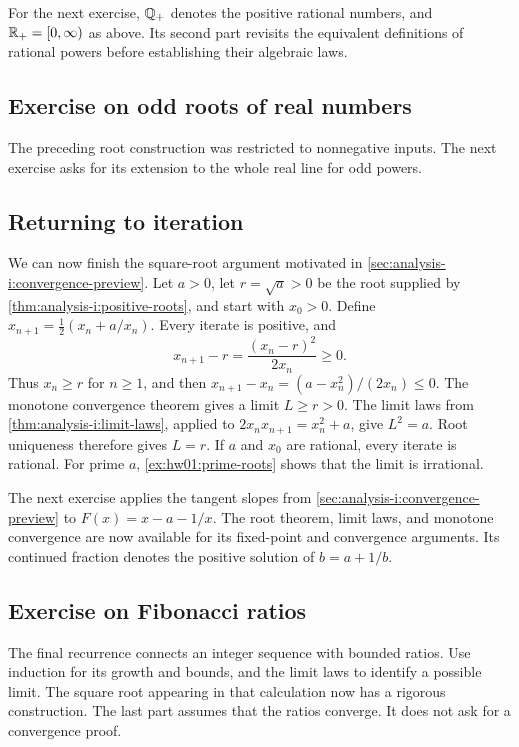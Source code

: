 For the next exercise, $\mathbb{Q}_+$ denotes the positive rational numbers,
and $\mathbb{R}_+=[0,\infty)$ as above. Its second part revisits the equivalent
definitions of rational powers before establishing their algebraic laws.



\subsection{Exercise on odd roots of real numbers}
The preceding root construction was restricted to nonnegative inputs.
The next exercise asks for its extension to the whole real line for odd
powers.



\subsection{Returning to iteration}
We can now finish the square-root argument motivated in
\autoref{sec:analysis-i:convergence-preview}. Let $a>0$, let
$r=\sqrt a>0$ be the root supplied by
\autoref{thm:analysis-i:positive-roots}, and start with $x_0>0$.
Define $x_{n+1}=\tfrac12(x_n+a/x_n)$. Every iterate is positive, and
\[
  x_{n+1}-r=\frac{(x_n-r)^2}{2x_n}\geq0.
\]
Thus $x_n\geq r$ for $n\geq1$, and then
$x_{n+1}-x_n=(a-x_n^2)/(2x_n)\leq0$.
The monotone convergence theorem gives a limit $L\geq r>0$.
The limit laws from \autoref{thm:analysis-i:limit-laws}, applied to
$2x_nx_{n+1}=x_n^2+a$, give $L^2=a$. Root uniqueness therefore gives
$L=r$. If $a$ and $x_0$ are rational, every iterate is rational.
For prime $a$, \autoref{ex:hw01:prime-roots} shows that the limit
is irrational.

The next exercise applies the tangent slopes from
\autoref{sec:analysis-i:convergence-preview} to $F(x)=x-a-1/x$.
The root theorem, limit laws, and monotone convergence are now available
for its fixed-point and convergence arguments. Its continued fraction
denotes the positive solution of $b=a+1/b$.



\subsection{Exercise on Fibonacci ratios}
The final recurrence connects an integer sequence with bounded ratios.
Use induction for its growth and bounds, and the limit laws to identify
a possible limit. The square root appearing in that calculation now
has a rigorous construction. The last part assumes that the ratios
converge. It does not ask for a convergence proof.


